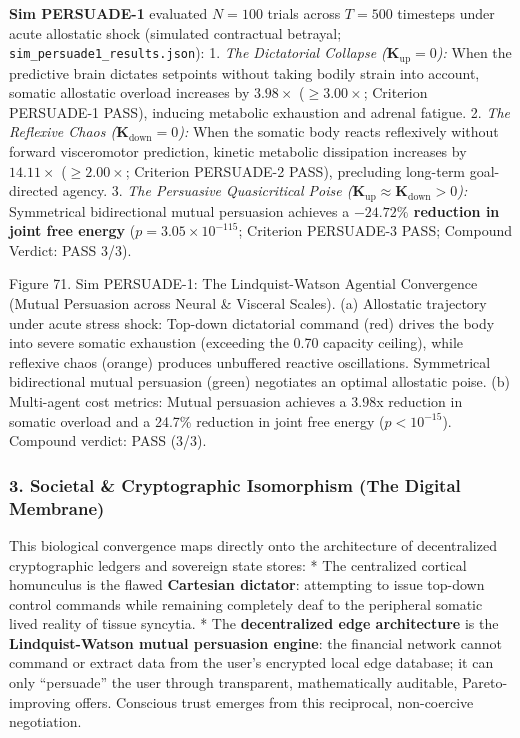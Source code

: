 \documentclass[
]{article}
\begin{document}
\textbf{Sim PERSUADE-1} evaluated \(N = 100\) trials across \(T = 500\)
timesteps under acute allostatic shock (simulated contractual betrayal;
\texttt{sim\_persuade1\_results.json}): 1. \emph{The Dictatorial
Collapse (\(\mathbf{K}_{\mathrm{up}} = 0\)):} When the predictive brain
dictates setpoints without taking bodily strain into account, somatic
allostatic overload increases by \textbf{\(3.98\times\)}
(\(\ge 3.00\times\); Criterion PERSUADE-1 PASS), inducing metabolic
exhaustion and adrenal fatigue. 2. \emph{The Reflexive Chaos
(\(\mathbf{K}_{\mathrm{down}} = 0\)):} When the somatic body reacts
reflexively without forward visceromotor prediction, kinetic metabolic
dissipation increases by \textbf{\(14.11\times\)} (\(\ge 2.00\times\);
Criterion PERSUADE-2 PASS), precluding long-term goal-directed agency.
3. \emph{The Persuasive Quasicritical Poise
(\(\mathbf{K}_{\mathrm{up}} \approx \mathbf{K}_{\mathrm{down}} > 0\)):}
Symmetrical bidirectional mutual persuasion achieves a
\textbf{\(-24.72\%\) reduction in joint free energy}
(\(p = 3.05 \times 10^{-115}\); Criterion PERSUADE-3 PASS; Compound
Verdict: PASS 3/3).

Figure 71. Sim PERSUADE-1: The Lindquist-Watson Agential Convergence
(Mutual Persuasion across Neural \& Visceral Scales). (a) Allostatic
trajectory under acute stress shock: Top-down dictatorial command (red)
drives the body into severe somatic exhaustion (exceeding the 0.70
capacity ceiling), while reflexive chaos (orange) produces unbuffered
reactive oscillations. Symmetrical bidirectional mutual persuasion
(green) negotiates an optimal allostatic poise. (b) Multi-agent cost
metrics: Mutual persuasion achieves a 3.98x reduction in somatic
overload and a 24.7\% reduction in joint free energy (\(p < 10^{-15}\)).
Compound verdict: PASS (3/3).

\subsubsection{3. Societal \& Cryptographic Isomorphism (The Digital
Membrane)}\label{societal-cryptographic-isomorphism-the-digital-membrane}

This biological convergence maps directly onto the architecture of
decentralized cryptographic ledgers and sovereign state stores: * The
centralized cortical homunculus is the flawed \textbf{Cartesian
dictator}: attempting to issue top-down control commands while remaining
completely deaf to the peripheral somatic lived reality of tissue
syncytia. * The \textbf{decentralized edge architecture} is the
\textbf{Lindquist-Watson mutual persuasion engine}: the financial
network cannot command or extract data from the user's encrypted local
edge database; it can only ``persuade'' the user through transparent,
mathematically auditable, Pareto-improving offers. Conscious trust
emerges from this reciprocal, non-coercive negotiation.
\end{document}
